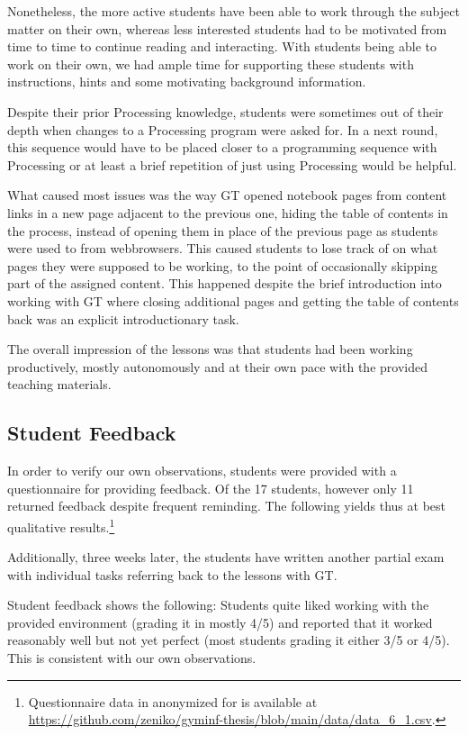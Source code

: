 Nonetheless, the more active students have been able to work through the subject matter on their own, whereas less interested students had to be motivated from time to time to continue reading and interacting. With students being able to work on their own, we had ample time for supporting these students with instructions, hints and some motivating background information.

Despite their prior Processing knowledge, students were sometimes out of their depth when changes to a Processing program were asked for. In a next round, this sequence would have to be placed closer to a programming sequence with Processing or at least a brief repetition of just using Processing would be helpful.

What caused most issues was the way GT opened notebook pages from content links in a new page adjacent to the previous one, hiding the table of contents in the process, instead of opening them in place of the previous page as students were used to from webbrowsers. This caused students to lose track of on what pages they were supposed to be working, to the point of occasionally skipping part of the assigned content. This happened despite the brief introduction into working with GT where closing additional pages and getting the table of contents back was an explicit introductionary task.

The overall impression of the lessons was that students had been working productively, mostly autonomously and at their own pace with the provided teaching materials.


\subsection{Student Feedback}

In order to verify our own observations, students were provided with a questionnaire for providing feedback. Of the 17 students, however only 11 returned feedback despite frequent reminding. The following yields thus at best qualitative results.\footnote{Questionnaire data in anonymized for is available at \url{https://github.com/zeniko/gyminf-thesis/blob/main/data/data_6_1.csv}.}

Additionally, three weeks later, the students have written another partial exam with individual tasks referring back to the lessons with GT.

Student feedback shows the following: Students quite liked working with the provided environment (grading it in mostly 4/5) and reported that it worked reasonably well but not yet perfect (most students grading it either 3/5 or 4/5). This is consistent with our own observations.

